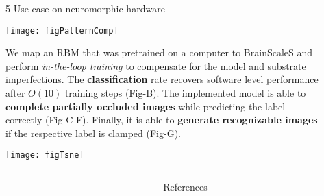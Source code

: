 \begin{frame}
\begin{columns}
\begin{column}{0.99\textwidth}
\begin{columns}[t]
\begin{column}{0.32\textwidth}
\begin{block}{\large 5 Use-case on neuromorphic hardware}
					\thirdBlockImSpace
					\begin{center}
						\texttt{[image: figPatternComp]}
					\end{center}
					\thirdBlockImSpace
					\vspace{-0.325cm}

					\begin{adjustwidth}{1.cm}{1.cm}
					\justify
					We map an RBM that was pretrained on a computer to BrainScaleS and perform \textit{in-the-loop training } to compensate for the model and substrate imperfections.
					The \textbf{classification} rate recovers software level performance after $O(10)$ training steps (Fig-B).
					The implemented model is able to \textbf{complete partially occluded images} while predicting the label correctly (Fig-C-F).
					Finally, it is able to \textbf{generate recognizable images} if the respective label is clamped (Fig-G).

					\end{adjustwidth}
					\thirdBlockImSpace
					\begin{center}
						\texttt{[image: figTsne]}
					\end{center}

					
					\blockSpaceTwo
					\end{block}


					\interBlockSpaceTwo




				\end{column}

				\begin{column}{.005\textwidth}\end{column}


			\end{columns}



		\end{column}
		\begin{column}{.005\textwidth}\end{column}
	\end{columns}

	\vspace{-0.9cm}

	\begin{columns}[t]
		\begin{column}{.01\textwidth}\end{column}

		\begin{column}{.98\textwidth}
			\begin{block}{References}
			 \begin{minipage}{0.79\linewidth}
								\tiny
								
								
			 \end{minipage}


\end{block}
\end{column}
\end{columns}
\end{frame}
